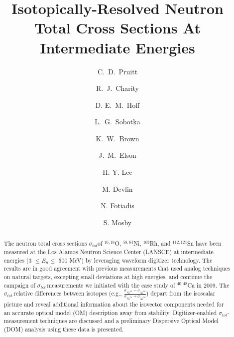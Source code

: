 \documentclass[twocolumn,secnumarabic,amssymb, nobibnotes, aps, prl,
superscriptaddress, nobalancelastpage]{revtex4}
\newcommand{\tot}{\ensuremath{\sigma_{tot}}}
\newcommand{\tots}{\ensuremath{\sigma_{tot}}\,}
\begin{document}
\begin{abstract}
    The neutron total cross sections \tot of $^{16,18}$O,
    $^{58,64}$Ni, $^{103}$Rh, and $^{112,124}$Sn have been measured at the Los Alamos
    Neutron Science Center (LANSCE) at intermediate energies (3 $\leq E_{n}
    \leq$ 500 MeV) by
    leveraging waveform digitizer technology. The results are in good agreement
    with previous measurements that used analog techniques on natural targets,
    excepting small deviations at high energies, and continue the campaign of
    \tots measurements we initiated with the case study of $^{40,48}$Ca in 2009.
    The \tots relative differences between isotopes (e.g.,
    $\frac{\sigma_{Ni^{64}}-\sigma_{Ni^{58}}} {\sigma_{Ni^{64}}+
    \sigma_{Ni^{58}}}$)
    depart from the isoscalar picture and reveal additional information about
    the isovector components needed for an accurate optical model (OM)
    description away from stability. Digitizer-enabled \tot-measurement
    techniques are discussed and a preliminary Dispersive Optical Model (DOM)
    analysis using these data is presented.
\end{abstract}

\title{Isotopically-Resolved Neutron Total Cross Sections At
Intermediate Energies}

\author{C.~D.~Pruitt}  
\author{R.~J.~Charity}
\author{D. E.~M.~Hoff}  
\author{L.~G.~Sobotka}
\author{K.~W.~Brown} 
\author{J.~M.~Elson}

\author{H. Y. Lee}
\author{M. Devlin}
\author{N. Fotiadis}
\author{S. Mosby}
\maketitle
\end{document}
